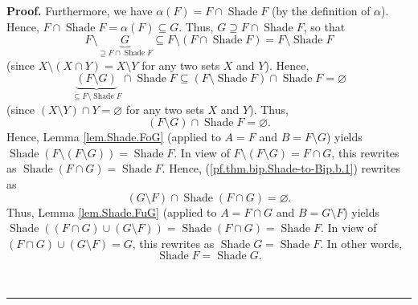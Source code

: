 \documentclass[numbers=enddot,12pt,final,onecolumn]{scrartcl}%
\theoremstyle{definition}
\newenvironment{proof}[1][Proof]{\noindent\textbf{#1.} }{\ \rule{0.5em}{0.5em}}
\begin{document}
\begin{proof}
Furthermore, we have $\alpha\left(  F\right)  =F\cap\operatorname*{Shade}F$
(by the definition of $\alpha$). Hence, $F\cap\operatorname*{Shade}%
F=\alpha\left(  F\right)  \subseteq G$. Thus, $G\supseteq F\cap
\operatorname*{Shade}F$, so that%
\[
F\setminus\underbrace{G}_{\supseteq F\cap\operatorname*{Shade}F}\subseteq
F\setminus\left(  F\cap\operatorname*{Shade}F\right)  =F\setminus
\operatorname*{Shade}F
\]
(since $X\setminus\left(  X\cap Y\right)  =X\setminus Y$ for any two sets $X$
and $Y$). Hence,%
\[
\underbrace{\left(  F\setminus G\right)  }_{\subseteq F\setminus
\operatorname*{Shade}F}\cap\operatorname*{Shade}F\subseteq\left(
F\setminus\operatorname*{Shade}F\right)  \cap\operatorname*{Shade}%
F=\varnothing
\]
(since $\left(  X\setminus Y\right)  \cap Y=\varnothing$ for any two sets $X$
and $Y$). Thus,%
\[
\left(  F\setminus G\right)  \cap\operatorname*{Shade}F=\varnothing.
\]
Hence, Lemma \ref{lem.Shade.FoG} (applied to $A=F$ and $B=F\setminus G$)
yields $\operatorname*{Shade}\left(  F\setminus\left(  F\setminus G\right)
\right)  =\operatorname*{Shade}F$. In view of $F\setminus\left(  F\setminus
G\right)  =F\cap G$, this rewrites as $\operatorname*{Shade}\left(  F\cap
G\right)  =\operatorname*{Shade}F$. Hence, (\ref{pf.thm.bip.Shade-to-Bip.b.1})
rewrites as
\[
\left(  G\setminus F\right)  \cap\operatorname*{Shade}\left(  F\cap G\right)
=\varnothing.
\]
Thus, Lemma \ref{lem.Shade.FuG} (applied to $A=F\cap G$ and $B=G\setminus F$)
yields \newline$\operatorname*{Shade}\left(  \left(  F\cap G\right)
\cup\left(  G\setminus F\right)  \right)  =\operatorname*{Shade}\left(  F\cap
G\right)  =\operatorname*{Shade}F$. In view of $\left(  F\cap G\right)
\cup\left(  G\setminus F\right)  =G$, this rewrites as $\operatorname*{Shade}%
G=\operatorname*{Shade}F$. In other words,
\[
\operatorname*{Shade}F=\operatorname*{Shade}G.
\]



\end{proof}
\end{document}
